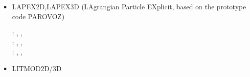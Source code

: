 \begin{itemize}
\begin{scriptsize}
\begin{itemize}
\item[\twothousandeight]     \textcite{scbe08}
\item[\twothousandten]       \textcite{kamm10}
\item[\twothousandeleven]    \textcite{lemk11}
\item[\twothousandtwelve]    \textcite{may12}
\item[\twothousandfourteen]  \textcite{lesh14},  \textcite{cokm14},  \textcite{bakp14}, 
                             \textcite{feka14a}, \textcite{feka14b}
\item[\twothousandfifteen]   \textcite{puka15},  \textcite{feka15},  \textcite{cofk15}
\item[\twothousandsixteen]   \textcite{kapb16},  \textcite{coyc16}
\item[\twothousandeighteen]  \textcite{pukp18},  \textcite{rekp18},  \textcite{repk18}
\item[\twothousandnineteen]  \textcite{eitp19},  \textcite{hooi19}, 
                             \textcite{pust19},  \textcite{wakz19}
\item[\twothousandtwenty]    \textcite{eitf20},  \textcite{spsk20}, 
                             \textcite{pust20},  \textcite{yakl20}, 
                             \textcite{spbe20},  \textcite{rehp20},
                             \textcite{pikw20}
\end{itemize}
\end{scriptsize}

\item LAPEX2D,LAPEX3D  (LAgrangian Particle EXplicit, based on the prototype code PAROVOZ) 

\begin{scriptsize}
\twothousandfive: \textcite{sopg05}, \textcite{baso05}, \textcite{soba05}\\
\twothousandsix: \textcite{bube06}, \textcite{basv06}, \textcite{sobk06}\textcite{peso06}\\
\twothousandeight: \textcite{peso08}, \textcite{baso08}, \textcite{scbe08}
\textcite{sosk11}
\end{scriptsize}

\item LITMOD2D/3D


\end{itemize}
